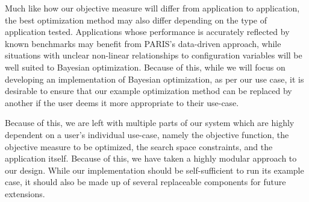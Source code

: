 \documentclass{report}
\begin{document}
Much like how our objective measure will differ from application to application, the best optimization method may also differ depending on the type of application tested. Applications whose performance is accurately reflected by known benchmarks may benefit from PARIS's data-driven approach, while situations with unclear non-linear relationships to configuration variables will be well suited to Bayesian optimization. Because of this, while we will focus on developing an implementation of Bayesian optimization, as per our use case, it is desirable to ensure that our example optimization method can be replaced by another if the user deems it more appropriate to their use-case.

Because of this, we are left with multiple parts of our system which are highly dependent on a user's individual use-case, namely the objective function, the objective measure to be optimized, the search space constraints, and the application itself. Because of this, we have taken a highly modular approach to our design. While our implementation should be self-sufficient to run its example case, it should also be made up of several replaceable components for future extensions.
 
\end{document}
